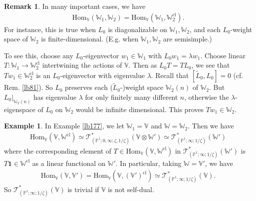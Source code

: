 \documentclass[12pt,a4paper,notitlepage]{article}
\theoremstyle{definition}
\newtheorem{eg}[df]{Example}
\newtheorem{rem}[df]{Remark}
\theoremstyle{plain}
\newcommand{\wtd}{\widetilde}
\newcommand{\id}{\mathbf{1}}
\newcommand{\Hom}{\mathrm{Hom}}
\newcommand{\scr}{\mathscr}
\newcommand{\Vbb}{\mathbb V}
\newcommand{\Wbb}{\mathbb W}
\newcommand{\Pbb}{\mathbb P}
\newcommand{\cl}{\mathrm{cl}}
\numberwithin{equation}{section}
\begin{document}
\begin{rem}
In many important cases, we have
\begin{align}
\Hom_\Vbb(\Wbb_1,\Wbb_2)=\Hom_\Vbb(\Wbb_1,\Wbb_2^\cl).
\end{align}
For instance, this is true when $L_0$ is diagonalizable on $\Wbb_1,\Wbb_2$, and each $L_0$-weight space of $\Wbb_2$ is finite-dimensional. (E.g. when $\Wbb_1,\Wbb_2$ are semisimple.) 

To see this, choose any $L_0$-eigenvector $w_1\in\Wbb_1$ with $L_0w_1=\lambda w_1$. Choose linear $T:\Wbb_1\rightarrow\Wbb_2^\cl$ intertwining the actions of $\Vbb$. Then as $L_0T=TL_0$, we see that $Tw_1\in\Wbb_2^\cl$ is an $L_0$-eigenvector with eigenvalue $\lambda$. Recall that $[\wtd L_0,L_0]=0$ (cf. Rem. \ref{lb81}). So $L_0$ preserves each ($\wtd L_0$-)weight space $\Wbb_2(n)$ of $\Wbb_2$. But $L_0|_{\Wbb_2(n)}$ has eigenvalue $\lambda$ for only finitely many different $n$, otherwise the $\lambda$-eigenspace of $L_0$ on $\Wbb_2$ would be infinite dimensional. This proves  $Tw_1\in\Wbb_2$.  \hfill\qedsymbol
\end{rem}







\begin{eg}\label{lb189}
In Example \ref{lb177}, we let $\Wbb_1=\Vbb$ and $\Wbb=\Wbb_2$. Then we have
\begin{align}
\Hom_\Vbb(\Vbb,\Wbb^\cl)\simeq\scr T_{(\Pbb^1;0,\infty;\zeta,1/\zeta)}^*(\Vbb\otimes\Wbb')\simeq\scr T_{(\Pbb^1;\infty;1/\zeta)}^*(\Wbb')
\end{align}
where the corresponding element of $T\in\Hom_\Vbb(\Vbb,\Wbb^\cl)$ in $\scr T_{(\Pbb^1;\infty;1/\zeta)}^*(\Wbb')$ is  $T\id\in\Wbb^\cl$ as a linear functional on $\Wbb'$. In particular, taking $\Wbb=\Vbb'$, we have
\begin{align}\label{eq256}
\Hom_\Vbb(\Vbb,\Vbb')=\Hom_\Vbb(\Vbb,(\Vbb')^\cl)\simeq \scr T_{(\Pbb^1;\infty;1/\zeta)}^*(\Vbb).
\end{align}
So $\scr T_{(\Pbb^1;\infty;1/\zeta)}^*(\Vbb)$ is trivial if $\Vbb$ is not self-dual.
\end{eg}







\subsection{}
\end{document}
